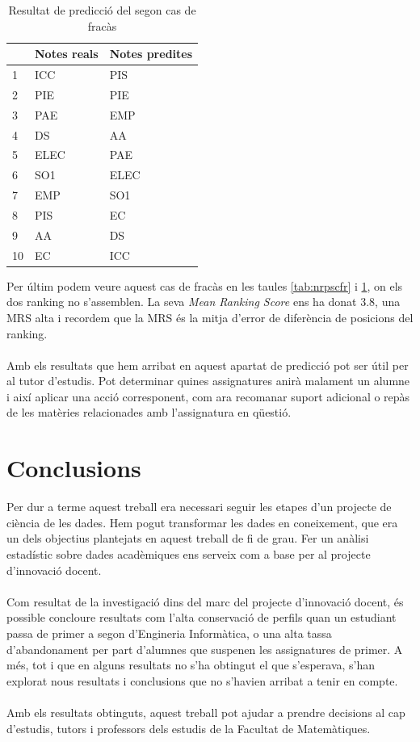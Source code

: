 \documentclass[12pt,a4paper,catalan]{article}
\begin{document}
\begin{table}[h]
\centering
\begin{tabular}{@{}lll@{}}
\toprule
     & Notes reals & Notes predites \\ \midrule
1    & ICC    & PIS       \\
2    & PIE    & PIE      \\
3    & PAE    & EMP       \\
4    & DS     & AA      \\
5    & ELEC   & PAE       \\
6    & SO1    & ELEC        \\
7    & EMP    & SO1       \\
8    & PIS    & EC      \\
9    & AA     & DS       \\
10   & EC     & ICC        \\ \bottomrule
\end{tabular}
\caption{Resultat de predicció del segon cas de fracàs}
\label{tab:rpscfr}
\end{table}

\newpage

Per últim podem veure aquest cas de fracàs en les taules \ref{tab:nrpscfr} i \ref{tab:rpscfr}, on els dos ranking no s'assemblen. La seva \textit{Mean Ranking Score} ens ha donat 3.8, una MRS alta i recordem que la MRS és la mitja d'error de diferència de posicions del ranking.
\\
\\
Amb els resultats que hem arribat en aquest apartat de predicció pot ser útil per al tutor d'estudis. Pot determinar quines assignatures anirà malament un alumne i així aplicar una acció corresponent, com ara recomanar suport adicional o repàs de les matèries relacionades amb l'assignatura en qüestió.

\newpage
\section{Conclusions}
Per dur a terme aquest treball era necessari seguir les etapes d'un projecte de ciència de les dades. Hem pogut transformar les dades en coneixement, que era un dels objectius plantejats en aquest treball de fi de grau. Fer un anàlisi estadístic sobre dades acadèmiques ens serveix com a base per al projecte d'innovació docent.
\\
\\
Com resultat de la investigació dins del marc del projecte d'innovació docent, és possible concloure resultats com l'alta conservació de perfils quan un estudiant passa de primer a segon d'Engineria Informàtica, o una alta tassa d'abandonament per part d'alumnes que suspenen les assignatures de primer. A més, tot i que en alguns resultats no s'ha obtingut el que s'esperava, s'han explorat nous resultats i conclusions que no s'havien arribat a tenir en compte.
\\
\\
Amb els resultats obtinguts, aquest treball pot ajudar a prendre decisions al cap d'estudis, tutors i professors dels estudis de la Facultat de Matemàtiques.
\end{document}
